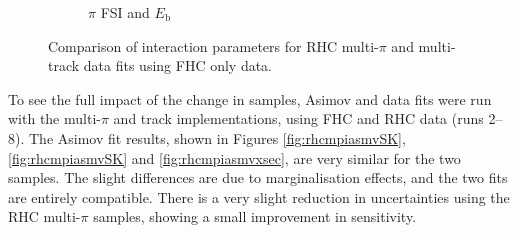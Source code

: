 \begin{figure}[t]
\begin{subfigure}{0.49\textwidth}
  \caption{$\pi$ FSI and $E_{\mathrm{b}}$}
\end{subfigure}
\caption{Comparison of interaction parameters for RHC multi-$\pi$ and multi-track data fits using FHC only data.}
\label{fig:rhcmpidat248xsec}
\end{figure}

To see the full impact of the change in samples, Asimov and data fits were run with the multi-$\pi$ and track implementations, using FHC and RHC data (runs 2--8). The Asimov fit results, shown in Figures \ref{fig:rhcmpiasmvSK}, \ref{fig:rhcmpiasmvSK} and \ref{fig:rhcmpiasmvxsec}, are very similar for the two samples. The slight differences are due to marginalisation effects, and the two fits are entirely compatible. There is a very slight reduction in uncertainties using the RHC multi-$\pi$ samples, showing a small improvement in sensitivity.

